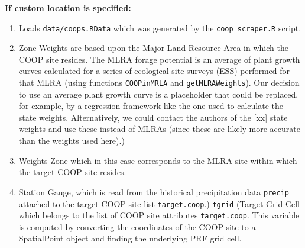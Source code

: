 \documentclass[11pt]{article}
\begin{document}
\textbf{If custom location is specified:}
\begin{enumerate}
\item Loads \verb!data/coops.RData! which was generated by the \verb!coop_scraper.R! script.
\item Zone Weights are based upon the Major Land Resource Area in which the COOP site resides. The MLRA forage potential is an average of plant growth curves calculated for a series of ecological site surveys (ESS) performed for that MLRA (using functions \verb!COOPinMRLA! and \verb!getMLRAWeights!). Our decision to use an average plant growth curve is a placeholder that could be replaced, for example, by a regression framework like the one used to calculate the state weights. Alternatively, we could contact the authors of the [xx] state weights and use these instead of MLRAs (since these are likely more accurate than the weights used here).)
\item Weights Zone which in this case corresponds to the MLRA site within which the target COOP site resides.
\item Station Gauge, which is read from the historical precipitation data \verb!precip! attached to the target COOP site list \verb!target.coop!.) \verb!tgrid! (Target Grid Cell which belongs to the list of COOP site attributes \verb!target.coop!. This variable is computed by converting the coordinates of the COOP site to a SpatialPoint object and finding the underlying PRF grid cell.
\end{enumerate}
\end{document}
